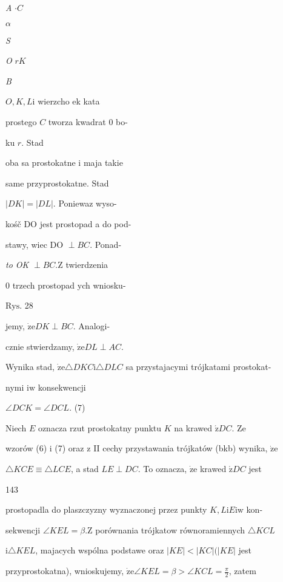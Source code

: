 \documentclass[a4paper,12pt]{article}
\begin{document}
{\it A} $\cdot C$

$\alpha$

{\it S}

{\it O} $r K$

{\it B}

$O, K, L \mathrm{i}$ wierzcho ek kata

prostego $C$ tworza kwadrat $0$ bo-

ku $r$. Stad

oba sa prostokatne $\mathrm{i}$ maja takie

same przyprostokatne. Stad

$|DK| = |DL|$. Poniewaz wyso-

kośč DO jest prostopad a do pod-

stawy, wiec DO $\perp BC$. Ponad-

{\it to OK} $\perp BC. \mathrm{Z}$ twierdzenia

$0$ trzech prostopad ych wniosku-

$\mathrm{R}\mathrm{y}\mathrm{s}$. 28

jemy, $\dot{\mathrm{z}}\mathrm{e} DK \perp BC$. Analogi-

cznie stwierdzamy, $\dot{\mathrm{z}}\mathrm{e} DL\perp AC.$

Wynika stad, $\dot{\mathrm{z}}\mathrm{e}\triangle DKC\mathrm{i}\triangle DLC$ sa przystajacymi trójkatami prostokat-

nymi $\mathrm{i}\mathrm{w}$ konsekwencji

$\angle DCK=\angle DCL$.   (7)

Niech $E$ oznacza rzut prostokatny punktu $K$ na krawed $\acute{\mathrm{z}} DC$. Ze

wzorów (6) $\mathrm{i}$ (7) oraz $\mathrm{z}$ II cechy przystawania trójkatów (bkb) wynika, $\dot{\mathrm{z}}\mathrm{e}$

$\triangle KCE \equiv \triangle LCE$, a stad $ LE\perp DC$. To oznacza, $\dot{\mathrm{z}}\mathrm{e}$ krawed $\acute{\mathrm{z}} DC$ jest





143

prostopadla do plaszczyzny wyznaczonej przez punkty $K, L\mathrm{i}E\mathrm{i}\mathrm{w}$ kon-

sekwencji $\angle KEL=\beta. \mathrm{Z}$ porównania trójkatow równoramiennych $\triangle KCL$

$\mathrm{i} \triangle KEL$, majacych wspólna podstawe oraz $|KE| < |KC| (|KE|$ jest

przyprostokatna), wnioskujemy, $\dot{\mathrm{z}}\mathrm{e} \angle KEL = \beta > \angle KCL = \displaystyle \frac{\pi}{2}$, zatem
\end{document}
